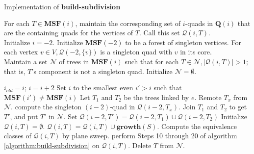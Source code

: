 \begin{algorithm}[H]
	\caption{Implementation of \textbf{build-subdivision}}  \label{algo:impl-build-subdivision}
    For each $T \in \mathbf{MSF}(i)$, maintain the corresponding set of $i$-quads in 
    $\mathbf{Q}(i)$ that are the containing quads for the vertices of $T$. Call this 
    set $\mathcal{Q}(i,T)$. \\
    
    Initialize $i=-2$. Initialize $\mathbf{MSF}(-2)$ to be a forest of singleton 
    vertices. For each vertex $v\in V, \mathcal{Q}(-2,\{v\})$ is a singleton quad 
    with $v$ in its core.\\
    
    Maintain a set $\mathcal{N}$ of trees in $\mathbf{MSF}(i)$ such that for each $T 
    \in \mathcal{N}, |\mathcal{Q}(i,T)| > 1$; that is, $T$'s component is not a 
    singleton quad. Initialize $\mathcal{N} = \emptyset$. \\
	\begin{algorithmic}[1]
        	\State $i_{old} = i$;
            	\State $i = i + 2$
            \Else
            	\State Set $i$ to the smallest even $i' > i$ such that $\mathbf{MSF}
                	   (i') \neq \mathbf{MSF}(i)$
            \EndIf
            	\State Let $T_1$ and $T_2$ be the trees linked by $e$.
                    	\State Remote $T_x$ from $\mathcal{N}$.
                    \Else
                    	\State compute the singleton $(i-2)$-quad in $\mathcal{Q} 
                        	   (i-2 ,T_x)$.
                    \EndIf
                \EndFor
                \State Join $T_1$ and $T_2$ to get $T'$, and put $T'$ in 
                	   $\mathcal{N}$.
                \State Set $\mathcal{Q}(i-2,T') = \mathcal{Q}(i-2, T_1) \cup 
                	   \mathcal{Q}(i-2,T_2)$
            \EndFor
            	\State Initialize $\mathcal{Q}(i,T) = \emptyset$.
                	\State $\mathcal{Q}(i,T) = \mathcal{Q}(i,T) \cup \mathbf{growth}
                    	   (S)$.
                \EndFor
                \State Compute the equivalence classes of $\mathcal{Q}(i,T)$ by plane
                	   sweep.
                \State perform Steps 10 through 20 of algorithm 
                	   \ref{algorithm:build-subdivision} on $\mathcal{Q}(i,T)$.
                	\State Delete $T$ from $\mathcal{N}$.
                \EndIf
            \EndFor
        \EndWhile
	\end{algorithmic} 
\end{algorithm}

